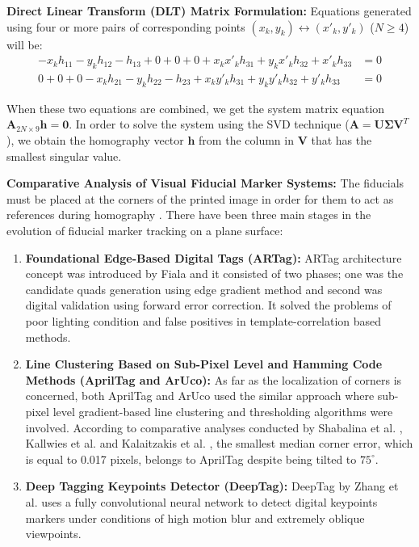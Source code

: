 \textbf{Direct Linear Transform (DLT) Matrix Formulation:} 
Equations generated using four or more pairs of corresponding points $(x_k, y_k) \leftrightarrow (x'_k, y'_k)$ ($N \ge 4$) will be:
\begin{align}
-x_k h_{11} - y_k h_{12} - h_{13} + 0 + 0 + 0 + x_k x'_k h_{31} + y_k x'_k h_{32} + x'_k h_{33} &= 0 \label{eq:dlt_row1} \\
0 + 0 + 0 - x_k h_{21} - y_k h_{22} - h_{23} + x_k y'_k h_{31} + y_k y'_k h_{32} + y'_k h_{33} &= 0 \label{eq:dlt_row2}
\end{align}

When these two equations are combined, we get the system matrix equation $\mathbf{A}_{2N \times 9} \mathbf{h} = \mathbf{0}$. In order to solve the system using the SVD technique ($\mathbf{A} = \mathbf{U} \mathbf{\Sigma} \mathbf{V}^T$), we obtain the homography vector $\mathbf{h}$ from the column in $\mathbf{V}$ that has the smallest singular value.



\textbf{Comparative Analysis of Visual Fiducial Marker Systems:} 
The fiducials must be placed at the corners of the printed image in order for them to act as references during homography \cite{Fiala2010Designing, Wang2016AprilTag2, Kallwies2020Determining, Shabalina2018ARTag, Kalaitzakis2021Fiducial, GarridoJurado2026ArUco, Zhang2022DeepTag}. There have been three main stages in the evolution of fiducial marker tracking on a plane surface:
\begin{enumerate}
    \item \textbf{Foundational Edge-Based Digital Tags (ARTag):} ARTag architecture concept was introduced by Fiala \cite{Fiala2010Designing} and it consisted of two phases; one was the candidate quads generation using edge gradient method and second was digital validation using forward error correction. It solved the problems of poor lighting condition and false positives in template-correlation based methods.
    \item \textbf{Line Clustering Based on Sub-Pixel Level and Hamming Code Methods (AprilTag and ArUco):} As far as the localization of corners is concerned, both AprilTag \cite{Wang2016AprilTag2} and ArUco \cite{GarridoJurado2026ArUco} used the similar approach where sub-pixel level gradient-based line clustering and thresholding algorithms were involved. According to comparative analyses conducted by Shabalina et al. \cite{Shabalina2018ARTag}, Kallwies et al. \cite{Kallwies2020Determining} and Kalaitzakis et al. \cite{Kalaitzakis2021Fiducial}, the smallest median corner error, which is equal to 0.017 pixels, belongs to AprilTag despite being tilted to $75^\circ$.
    \item \textbf{Deep Tagging Keypoints Detector (DeepTag):} DeepTag by Zhang et al. \cite{Zhang2022DeepTag} uses a fully convolutional neural network to detect digital keypoints markers under conditions of high motion blur and extremely oblique viewpoints.
\end{enumerate}

